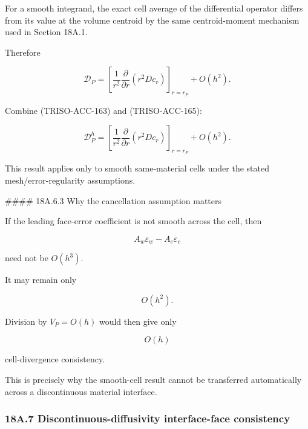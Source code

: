 \documentclass[11pt,a4paper]{article}
\begin{document}
For a smooth integrand, the exact cell average of the differential operator differs from its value at the volume centroid by the same centroid-moment mechanism used in Section 18A.1.

Therefore

\begin{equation}
\mathcal D_P
=
\left[
\frac1{r^2}
\frac{\partial}{\partial r}
\left(
r^2D c_r
\right)
\right]_{r=r_P}
+
O(h^2).
\tag{TRISO-ACC-165}
\label{eq:triso-acc-165}
\end{equation}

Combine (TRISO-ACC-163) and (TRISO-ACC-165):

\begin{equation}
\boxed{
\mathcal D_P^h
=
\left[
\frac1{r^2}
\frac{\partial}{\partial r}
\left(
r^2D c_r
\right)
\right]_{r=r_P}
+
O(h^2).
}
\tag{TRISO-ACC-166}
\label{eq:triso-acc-166}
\end{equation}

This result applies only to smooth same-material cells under the stated mesh/error-regularity assumptions.

\#\#\#\# 18A.6.3 Why the cancellation assumption matters

If the leading face-error coefficient is not smooth across the cell, then

\begin{equation}
A_w\varepsilon_w-A_e\varepsilon_e
\tag{TRISO-ACC-167}
\label{eq:triso-acc-167}
\end{equation}

need not be $O(h^3)$.

It may remain only

\begin{equation}
O(h^2).
\tag{TRISO-ACC-168}
\label{eq:triso-acc-168}
\end{equation}

Division by $V_P=O(h)$ would then give only

\begin{equation}
O(h)
\tag{TRISO-ACC-169}
\label{eq:triso-acc-169}
\end{equation}

cell-divergence consistency.

This is precisely why the smooth-cell result cannot be transferred automatically across a discontinuous material interface.

\subsubsection*{18A.7 Discontinuous-diffusivity interface-face consistency}
\end{document}
